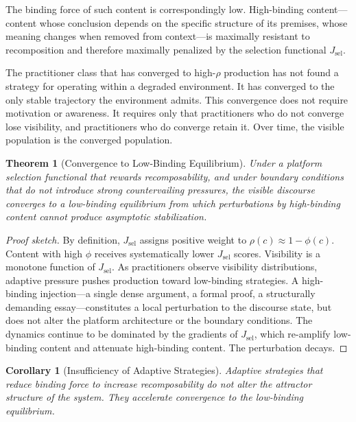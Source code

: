 \documentclass[12pt]{article}
\newtheorem{theorem}{Theorem}[section]
\newtheorem{corollary}{Corollary}[theorem]
\newcommand{\bind}{\phi}
\newcommand{\recomp}{\rho}
\newcommand{\Jsel}{J_{\mathrm{sel}}}
\begin{document}
The binding force of such content is correspondingly low. High-binding
content---content whose conclusion depends on the specific structure of
its premises, whose meaning changes when removed from context---is
maximally resistant to recomposition and therefore maximally penalized
by the selection functional $\Jsel$.

The practitioner class that has converged to high-$\recomp$ production
has not found a strategy for operating within a degraded environment.
It has converged to the only stable trajectory the environment admits.
This convergence does not require motivation or awareness. It requires
only that practitioners who do not converge lose visibility, and
practitioners who do converge retain it. Over time, the visible
population is the converged population.

\begin{theorem}[Convergence to Low-Binding Equilibrium]
\label{thm:convergence}
Under a platform selection functional that rewards recomposability, and
under boundary conditions that do not introduce strong countervailing
pressures, the visible discourse converges to a low-binding equilibrium
from which perturbations by high-binding content cannot produce
asymptotic stabilization.
\end{theorem}

\begin{proof}[Proof sketch]
By definition, $\Jsel$ assigns positive weight to $\recomp(c) \approx
1 - \bind(c)$. Content with high $\bind$ receives systematically lower
$\Jsel$ scores. Visibility is a monotone function of $\Jsel$. As
practitioners observe visibility distributions, adaptive pressure pushes
production toward low-binding strategies. A high-binding
injection---a single dense argument, a formal proof, a structurally
demanding essay---constitutes a local perturbation to the discourse
state, but does not alter the platform architecture or the boundary
conditions. The dynamics continue to be dominated by the gradients of
$\Jsel$, which re-amplify low-binding content and attenuate high-binding
content. The perturbation decays.
\end{proof}

\begin{corollary}[Insufficiency of Adaptive Strategies]
Adaptive strategies that reduce binding force to increase
recomposability do not alter the attractor structure of the system.
They accelerate convergence to the low-binding equilibrium.
\end{corollary}
\end{document}
